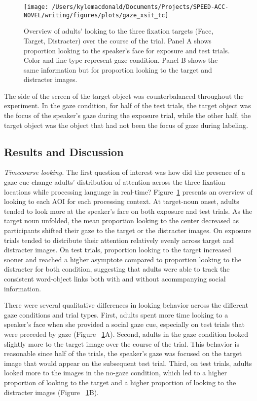 \documentclass[man,floatsintext]{apa6}
\begin{document}
\begin{figure}[!t]

{\centering \texttt{[image: /Users/kylemacdonald/Documents/Projects/SPEED-ACC-NOVEL/writing/figures/plots/gaze\_xsit\_tc]} 

}

\caption{Overview of adults' looking to the three fixation targets (Face, Target, Distracter) over the course of the trial. Panel A shows proportion looking to the speaker's face for exposure and test trials. Color and line type represent gaze condition. Panel B shows the same information but for proportion looking to the target and distracter images.}\label{fig:gaze-xsit-tc-plot}
\end{figure}

The side of the screen of the target object was counterbalanced
throughout the experiment. In the gaze condition, for half of the test
trials, the target object was the focus of the speaker's gaze during the
exposure trial, while the other half, the target object was the object
that had not been the focus of gaze during labeling.

\subsection{Results and Discussion}\label{results-and-discussion-1}

\emph{Timecourse looking.} The first question of interest was how did
the presence of a gaze cue change adults' distribution of attention
across the three fixation locations while processing language in
real-time? Figure~\ref{fig:gaze-xsit-tc-plot} presents an overview of
looking to each AOI for each processing context. At target-noun onset,
adults tended to look more at the speaker's face on both exposure and
test trials. As the target noun unfolded, the mean proportion looking to
the center decreased as participants shifted their gaze to the target or
the distracter images. On exposure trials tended to distribute their
attention relatively evenly across target and distracter images. On test
trials, proportion looking to the target increased sooner and reached a
higher asymptote compared to proportion looking to the distracter for
both condition, suggesting that adults were able to track the consistent
word-object links both with and without acommpanying social information.

There were several qualitative differences in looking behavior across
the different gaze conditions and trial types. First, adults spent more
time looking to a speaker's face when she provided a social gaze cue,
especially on test trials that were preceded by gaze (Figure
~\ref{fig:gaze-xsit-tc-plot}A). Second, adults in the gaze condition
looked slightly more to the target image over the course of the trial.
This behavior is reasonable since half of the trials, the speaker's gaze
was focused on the target image that would appear on the subsequent test
trial. Third, on test trials, adults looked more to the images in the
no-gaze condition, which led to a higher proportion of looking to the
target and a higher proportion of looking to the distracter images
(Figure ~\ref{fig:gaze-xsit-tc-plot}B).
\end{document}

